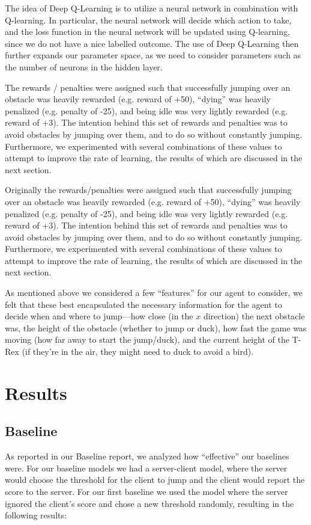 \documentclass{scrartcl}
\begin{document}
    The idea of Deep Q-Learning is to utilize a neural network in combination
    with Q-learning. In particular, the neural network will decide which action
    to take, and the loss function in the neural network will be updated using
    Q-learning, since we do not have a nice labelled outcome. The use of
    Deep Q-Learning then further expands our parameter space, as we need to
    consider parameters such as the number of neurons in the hidden layer.

    The rewards / penalties were assigned such that successfully jumping over an
    obstacle was heavily rewarded (e.g. reward of +50), ``dying'' was heavily
    penalized (e.g. penalty of -25), and being idle was very lightly rewarded
    (e.g. reward of +3). The intention behind this set of rewards and penalties
    was to avoid obstacles by jumping over them, and to do so without constantly
    jumping. Furthermore, we experimented with several combinations of these
    values to attempt to improve the rate of learning, the results of which are
    discussed in the next section.

    Originally the rewards/penalties were assigned such that successfully
    jumping over an obstacle was heavily rewarded (e.g. reward of +50),
    ``dying'' was heavily penalized (e.g. penalty of -25), and being idle was
    very lightly rewarded (e.g. reward of +3). The intention behind this set of
    rewards and penalties was to avoid obstacles by jumping over them, and to do
    so without constantly jumping. Furthermore, we experimented with several
    combinations of these values to attempt to improve the rate of learning, the
    results of which are discussed in the next section.

    As mentioned above we considered a few ``features'' for our agent to
    consider, we felt that these best encapsulated the necessary information for
    the agent to decide when and where to jump---how close (in the $x$
    direction) the next obstacle was, the height of the obstacle (whether to
    jump or duck), how fast the game was moving (how far away to start the
    jump/duck), and the current height of the T-Rex (if they're in the air,
    they might need to duck to avoid a bird).

\section{Results}

    \subsection{Baseline}
    As reported in our Baseline report, we analyzed how ``effective'' our
    baselines were. For our baseline models we had a server-client model, where
    the server would choose the threshold for the client to jump and the client
    would report the score to the server. For our first baseline we used the
    model where the server ignored the client's score and chose a new threshold
    randomly, resulting in the following results:
\end{document}
